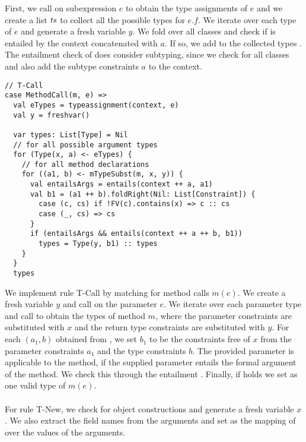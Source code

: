 First, we call  on subexpression $e$ to obtain
the type assignments of $e$ and we create a list $\mathit{ts}$ to collect
all the possible types for $e.f$.
We iterate over each type  of $e$ and generate a fresh variable $y$.
We fold over all classes  and check if 
is entailed by the context concatenated with $a$.
If so, we add  to the collected types .
The entailment check of  does consider subtyping,
since we check for all classes and also add the subtype constraints $a$
to the context.\\
%
\begin{lstlisting}[caption={Case T-Call},label=lst:scala-typeass-call,captionpos=b,frame={lines}]
// T-Call
case MethodCall(m, e) =>
  val eTypes = typeassignment(context, e)
  val y = freshvar()

  var types: List[Type] = Nil
  // for all possible argument types
  for (Type(x, a) <- eTypes) {
    // for all method declarations
    for ((a1, b) <- mTypeSubst(m, x, y)) {
      val entailsArgs = entails(context ++ a, a1)
      val b1 = (a1 ++ b).foldRight(Nil: List[Constraint]) {
        case (c, cs) if !FV(c).contains(x) => c :: cs
        case (_, cs) => cs
      }
      if (entailsArgs && entails(context ++ a ++ b, b1))
        types = Type(y, b1) :: types
    }
  }
  types
\end{lstlisting}
%
We implement rule T-Call by matching for method calls $m(e)$.
We create a fresh variable $y$
and call  on the parameter $e$.
We iterate over each parameter type 
and call  to obtain
the types of method $m$,
where the parameter constraints are substituted with $x$
and the return type constraints are substituted with $y$.
For each $(a_1, b)$ obtained from ,
we set $b_1$ to be the constraints free of $x$
from the parameter constraints $a_1$
and the type constraints $b$.
The provided parameter is applicable to the method,
if the supplied parameter entails the formal argument of the method.
We check this through the entailment .
Finally, if  holds
we set  as one valid type of $m(e)$.\\
\\
For rule T-New, we check for object constructions 
and generate a fresh variable $x$.
We also extract the field names from the arguments
and set  as the mapping of
 over the values of the arguments.
